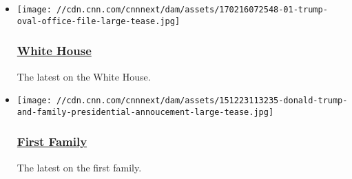 \begin{itemize}
\item
  \href{/specials/politics/trump-white-house}{}

  \texttt{[image: //cdn.cnn.com/cnnnext/dam/assets/170216072548-01-trump-oval-office-file-large-tease.jpg]}

  \hypertarget{white-house}{%
  \subsubsection{\texorpdfstring{\href{/specials/politics/trump-white-house}{White
  House}}{White House}}\label{white-house}}

  The latest on the White House.
\item
  \href{/specials/politics/first-family}{}

  \texttt{[image: //cdn.cnn.com/cnnnext/dam/assets/151223113235-donald-trump-and-family-presidential-annoucement-large-tease.jpg]}

  \hypertarget{first-family}{%
  \subsubsection{\texorpdfstring{\href{/specials/politics/first-family}{First
  Family}}{First Family}}\label{first-family}}

  The latest on the first family.
\end{itemize}

